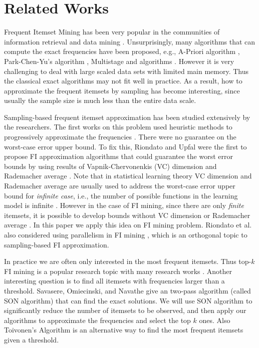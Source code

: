 \documentclass{article}
\begin{document}
\section{Related Works}
\label{sec:rw}
Frequent Itemset Mining has been very popular in the communities of information retrieval and data mining \cite{LRU14}. Unsurprisingly, many algorithms that can compute the exact frequencies have been proposed, e.g., A-Priori algorithm \cite{AIS93}, Park-Chen-Yu's algorithm \cite{PCY95}, Multistage and algorithms \cite{FSG99}.
However it is very challenging to deal with large scaled data sets with limited main memory. Thus the classical exact algorithms may not fit well in practice. As a result, how to approximate the frequent itemsets by sampling has become interesting, since usually the sample size is much less than the entire data scale.

Sampling-based frequent itemset approximation has been studied extensively by the researchers. The first works on this problem used heuristic methods to progressively approximate the frequencies \cite{CHS02,CCY05,Parth02}. There were no guarantee on the worst-case error upper bound. To fix this, Riondato and Upfal were the first to propose FI approximation algorithms that could guarantee the worst error bounds by using results of Vapnik-Chervonenkis (VC) dimension \cite{RU12,RU14} and Rademacher average \cite{RU15}. Note that in statistical learning theory VC dimension and Rademacher average are usually used to address the worst-case error upper bound for \emph{infinite case}, i.e., the number of possible functions in the learning model is infinite \cite{BBL04}. However in the case of FI mining, since there are only \emph{finite} itemsets, it is possible to develop bounds without VC dimension or Rademacher average \cite{BBL04}. In this paper we apply this idea on FI mining problem. Riondato et al. also considered using parallelism in FI mining \cite{RDF12}, which is an orthogonal topic to sampling-based FI approximation.

In practice we are often only interested in the most frequent itemsets. Thus top-$k$ FI mining is a popular research topic with many research works \cite{PRU10,SW02,RU15,RV14}. Another interesting question is to find all itemsets with frequencies larger than a threshold. Savasere, Omiecinski, and Navathe \cite{SON95} give an two-pass algorithm (called SON algorithm) that can find the exact solutions. We will use SON algorithm to significantly reduce the number of itemsets to be observed, and then apply our algorithms to approximate the frequencies and select the top $k$ ones. Also Toivonen’s Algorithm \cite{Toi96} is an alternative way to find the most frequent itemsets given a threshold.
\end{document}
